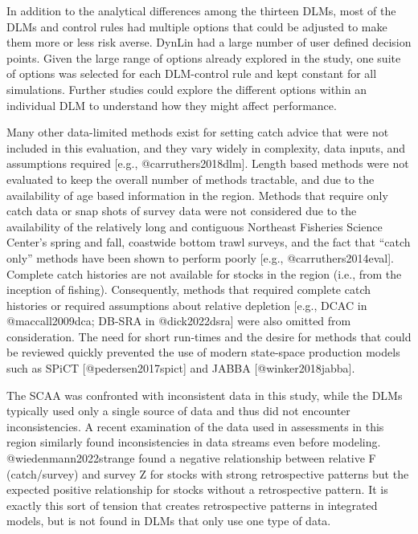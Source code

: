 \documentclass[
  12pt,
]{article}
\begin{document}
In addition to the analytical differences among the thirteen DLMs, most of the DLMs and control rules had multiple options that could be adjusted to make them more or less risk averse. DynLin had a large number of user defined decision points. Given the large range of options already explored in the study, one suite of options was selected for each DLM-control rule and kept constant for all simulations. Further studies could explore the different options within an individual DLM to understand how they might affect performance.

Many other data-limited methods exist for setting catch advice that were not included in this evaluation, and they vary widely in complexity, data inputs, and assumptions required {[}e.g., @carruthers2018dlm{]}. Length based methods were not evaluated to keep the overall number of methods tractable, and due to the availability of age based information in the region. Methods that require only catch data or snap shots of survey data were not considered due to the availability of the relatively long and contiguous Northeast Fisheries Science Center's spring and fall, coastwide bottom trawl surveys, and the fact that ``catch only'' methods have been shown to perform poorly {[}e.g., @carruthers2014eval{]}. Complete catch histories are not available for stocks in the region (i.e., from the inception of fishing). Consequently, methods that required complete catch histories or required assumptions about relative depletion {[}e.g., DCAC in @maccall2009dca; DB-SRA in @dick2022dsra{]} were also omitted from consideration. The need for short run-times and the desire for methods that could be reviewed quickly prevented the use of modern state-space production models such as SPiCT {[}@pedersen2017spict{]} and JABBA {[}@winker2018jabba{]}.

The SCAA was confronted with inconsistent data in this study, while the DLMs typically used only a single source of data and thus did not encounter inconsistencies. A recent examination of the data used in assessments in this region similarly found inconsistencies in data streams even before modeling. @wiedenmann2022strange found a negative relationship between relative F (catch/survey) and survey Z for stocks with strong retrospective patterns but the expected positive relationship for stocks without a retrospective pattern. It is exactly this sort of tension that creates retrospective patterns in integrated models, but is not found in DLMs that only use one type of data.
\end{document}
